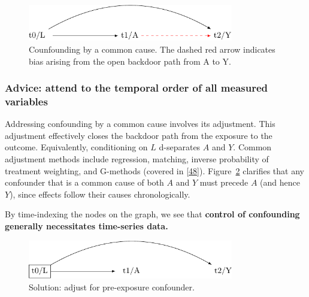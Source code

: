 \documentclass[
  singlecolumn]{article}
\begin{document}
\begin{figure}

{\centering \includegraphics[width=0.8\textwidth,height=\textheight]{causal-dags_files/figure-pdf/fig-dag-common-cause-1.pdf}

}

\caption{\label{fig-dag-common-cause}Counfounding by a common cause. The
dashed red arrow indicates bias arising from the open backdoor path from
A to Y.}

\end{figure}

\hypertarget{advice-attend-to-the-temporal-order-of-all-measured-variables}{%
\subsubsection{Advice: attend to the temporal order of all measured
variables}\label{advice-attend-to-the-temporal-order-of-all-measured-variables}}

Addressing confounding by a common cause involves its adjustment. This
adjustment effectively closes the backdoor path from the exposure to the
outcome. Equivalently, conditioning on \(L\) d-separates \(A\) and
\(Y\). Common adjustment methods include regression, matching, inverse
probability of treatment weighting, and G-methods (covered in
{[}\protect\hyperlink{ref-hernuxe1n2023a}{48}{]}).
Figure~\ref{fig-dag-common-cause-solution} clarifies that any confounder
that is a common cause of both \(A\) and \(Y\) must precede \(A\) (and
hence \(Y\)), since effects follow their causes chronologically.

By time-indexing the nodes on the graph, we see that \textbf{control of
confounding generally necessitates time-series data.}

\begin{figure}

{\centering \includegraphics[width=0.8\textwidth,height=\textheight]{causal-dags_files/figure-pdf/fig-dag-common-cause-solution-1.pdf}

}

\caption{\label{fig-dag-common-cause-solution}Solution: adjust for
pre-exposure confounder.}

\end{figure}
\end{document}
